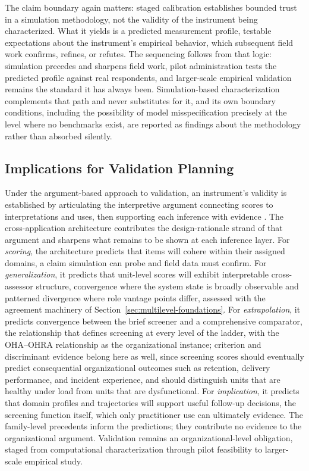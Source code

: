 \documentclass[12pt, letterpaper]{article}
\begin{document}
The claim boundary again matters: staged calibration establishes bounded trust in a simulation methodology, not the validity of the instrument being characterized. What it yields is a predicted measurement profile, testable expectations about the instrument's empirical behavior, which subsequent field work confirms, refines, or refutes. The sequencing follows from that logic: simulation precedes and sharpens field work, pilot administration tests the predicted profile against real respondents, and larger-scale empirical validation remains the standard it has always been. Simulation-based characterization complements that path and never substitutes for it, and its own boundary conditions, including the possibility of model misspecification precisely at the level where no benchmarks exist, are reported as findings about the methodology rather than absorbed silently.

\subsection{Implications for Validation Planning}
\label{sec:validation-implications}

Under the argument-based approach to validation, an instrument's validity is established by articulating the interpretive argument connecting scores to interpretations and uses, then supporting each inference with evidence \parencite{kane2006,cronbach1955,messick1995,aera2014}. The cross-application architecture contributes the design-rationale strand of that argument and sharpens what remains to be shown at each inference layer. For \emph{scoring}, the architecture predicts that items will cohere within their assigned domains, a claim simulation can probe and field data must confirm. For \emph{generalization}, it predicts that unit-level scores will exhibit interpretable cross-assessor structure, convergence where the system state is broadly observable and patterned divergence where role vantage points differ, assessed with the agreement machinery of Section~\ref{sec:multilevel-foundations}. For \emph{extrapolation}, it predicts convergence between the brief screener and a comprehensive comparator, the relationship that defines screening at every level of the ladder, with the OHA--OHRA relationship as the organizational instance; criterion and discriminant evidence belong here as well, since screening scores should eventually predict consequential organizational outcomes such as retention, delivery performance, and incident experience, and should distinguish units that are healthy under load from units that are dysfunctional. For \emph{implication}, it predicts that domain profiles and trajectories will support useful follow-up decisions, the screening function itself, which only practitioner use can ultimately evidence. The family-level precedents inform the predictions; they contribute no evidence to the organizational argument. Validation remains an organizational-level obligation, staged from computational characterization through pilot feasibility to larger-scale empirical study.
\end{document}
